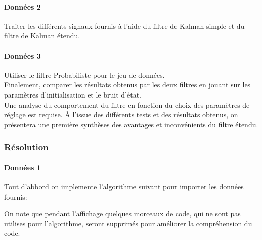 \documentclass{article}
\begin{document}
\paragraph{Données 2}Traiter les différents signaux fournis à l'aide du filtre de Kalman simple et du filtre de Kalman étendu.

\paragraph{Données 3}Utiliser le filtre Probabiliste pour le jeu de données.\\

\noindent Finalement, comparer les résultats obtenus par les deux filtres en jouant sur les paramètres d'initialisation et le bruit d'état.\\

\noindent Une analyse du comportement du filtre en fonction du choix des paramètres de réglage est requise. À l'issue des différents tests et des résultats obtenus, on présentera une première synthèses des avantages et inconvénients du filtre étendu.

\subsubsection{Résolution}
\paragraph{Données 1}Tout d'abbord on implemente l'algorithme suivant pour importer les données fournis:
\begin{scriptsize}\mycode
    
\end{scriptsize}
On note que pendant l'affichage quelques morceaux de code, qui ne sont pas utilises pour l'algorithme, seront supprimés pour améliorer la compréhension du code.
\end{document}
